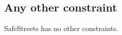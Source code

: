 \documentclass[../../../RASD.tex]{subfiles}
\begin{document}
\subsection{Any other constraint\label{sect:3.4.3}}

SafeStreets has no other constraints. 
\end{document}

